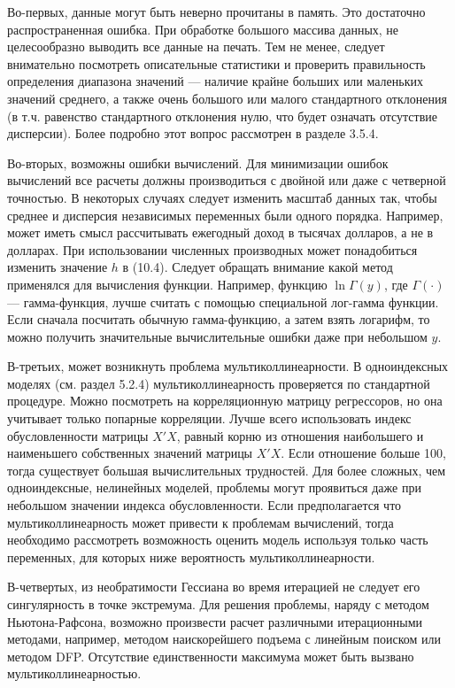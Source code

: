 Во-первых, данные могут быть неверно прочитаны в память. Это достаточно распространенная ошибка. При обработке большого массива данных, не целесообразно выводить все данные на печать. Тем не менее, следует внимательно посмотреть описательные статистики и проверить правильность определения диапазона значений --- наличие крайне больших или маленьких значений среднего, а также очень большого или малого стандартного отклонения (в т.ч. равенство стандартного отклонения нулю, что будет означать отсутствие дисперсии). Более подробно этот вопрос рассмотрен в разделе 3.5.4.

Во-вторых, возможны ошибки вычислений. Для минимизации ошибок вычислений все расчеты должны производиться с двойной или даже с четверной точностью. В некоторых случаях следует изменить масштаб данных так, чтобы среднее и дисперсия независимых переменных были одного порядка. Например, может иметь смысл рассчитывать ежегодный доход в тысячах долларов, а не в долларах. При использовании численных производных может понадобиться изменить значение $h$ в (10.4). Следует обращать внимание какой метод применялся для вычисления функции. Например, функцию $\ln \Gamma(y)$, где $\Gamma(\cdot)$ --- гамма-функция, лучше считать с помощью специальной лог-гамма функции. Если сначала посчитать обычную гамма-функцию, а затем взять логарифм, то можно получить значительные вычислительные ошибки даже при небольшом  $y$.

В-третьих, может возникнуть проблема мультиколлинеарности. В одноиндексных моделях (см. раздел 5.2.4) мультиколлинеарность проверяется по стандартной процедуре. Можно посмотреть на корреляционную матрицу регрессоров, но она учитывает только попарные корреляции. Лучше всего использовать индекс обусловленности матрицы $X'X$,  равный корню из отношения наибольшего и наименьшего собственных значений матрицы $X'X$. Если отношение больше 100, тогда существует большая вычислительных трудностей. Для более сложных, чем одноиндексные,  нелинейных моделей, проблемы могут проявиться даже при небольшом значении индекса обусловленности. Если предполагается что мультиколлинеарность может привести к проблемам  вычислений, тогда необходимо рассмотреть возможность оценить модель используя только часть переменных, для которых ниже вероятность мультиколлинеарности. 

В-четвертых, из необратимости Гессиана во время итерацией не следует его сингулярность в точке экстремума. Для решения проблемы, наряду с методом Ньютона-Рафсона, возможно произвести расчет различными итерационными методами, например, методом наискорейшего подъема с линейным поиском или методом DFP. Отсутствие единственности максимума может быть вызвано мультиколлинеарностью.

